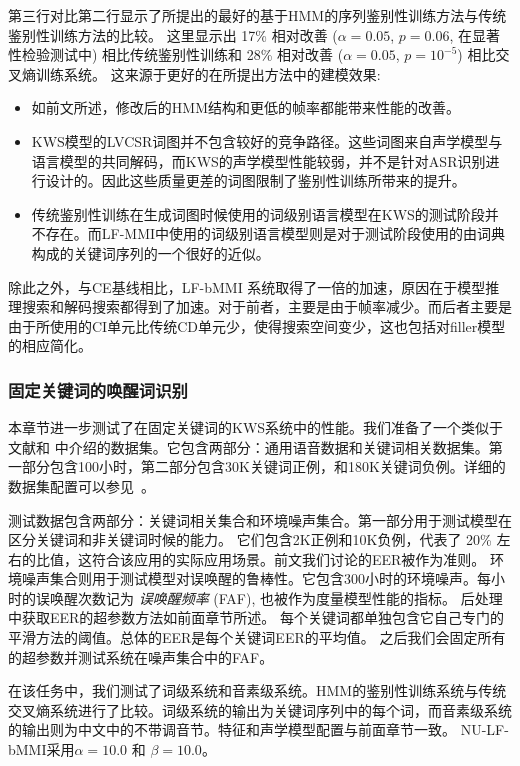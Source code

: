 第三行对比第二行显示了所提出的最好的基于HMM的序列鉴别性训练方法与传统鉴别性训练方法的比较。
这里显示出 17\% 相对改善 ($\alpha = 0.05$, $p = 0.06$, 在显著性检验测试中) 相比传统鉴别性训练和 28\% 相对改善 ($\alpha = 0.05$, $p = 10^{-5}$)  相比交叉熵训练系统。
这来源于更好的在所提出方法中的建模效果:
\begin{itemize}
 \item 如前文所述，修改后的HMM结构和更低的帧率都能带来性能的改善。
 \item KWS模型的LVCSR词图并不包含较好的竞争路径。这些词图来自声学模型与语言模型的共同解码，而KWS的声学模型性能较弱，并不是针对ASR识别进行设计的。因此这些质量更差的词图限制了鉴别性训练所带来的提升。
 \item 传统鉴别性训练在生成词图时候使用的词级别语言模型在KWS的测试阶段并不存在。而LF-MMI中使用的词级别语言模型则是对于测试阶段使用的由词典构成的关键词序列的一个很好的近似。
\end{itemize}
除此之外，与CE基线相比，LF-bMMI 系统取得了一倍的加速，原因在于模型推理搜索和解码搜索都得到了加速。对于前者，主要是由于帧率减少。而后者主要是由于所使用的CI单元比传统CD单元少，使得搜索空间变少，这也包括对filler模型的相应简化。


\subsubsection{固定关键词的唤醒词识别}
\label{Sec:exp-wakeup-word-rec}

本章节进一步测试了在固定关键词的KWS系统中的性能。我们准备了一个类似于文献\cite{chen2014small}和  \cite{cas-icassp17}中介绍的数据集。它包含两部分：通用语音数据和关键词相关数据集。第一部分包含100小时，第二部分包含30K关键词正例，和180K关键词负例。详细的数据集配置可以参见~\cite{chen2018kws}。

测试数据包含两部分：关键词相关集合和环境噪声集合。第一部分用于测试模型在区分关键词和非关键词时候的能力\cite{chen2014small}。 它们包含2K正例和10K负例，代表了 20\% 左右的比值，这符合该应用的实际应用场景。前文我们讨论的EER被作为准则。
环境噪声集合则用于测试模型对误唤醒的鲁棒性\cite{cas-icassp17}。它包含300小时的环境噪声。每小时的误唤醒次数记为 {\em{误唤醒频率}} (FAF), 也被作为度量模型性能的指标。
后处理中获取EER的超参数方法如前面章节所述。
每个关键词都单独包含它自己专门的平滑方法的阈值。总体的EER是每个关键词EER的平均值。
之后我们会固定所有的超参数并测试系统在噪声集合中的FAF。

在该任务中，我们测试了词级系统和音素级系统。HMM的鉴别性训练系统与传统交叉熵系统进行了比较。词级系统的输出为关键词序列中的每个词，而音素级系统的输出则为中文中的不带调音节。特征和声学模型配置与前面章节一致。
NU-LF-bMMI采用$\alpha=10.0$ 和 $\beta=10.0$。

